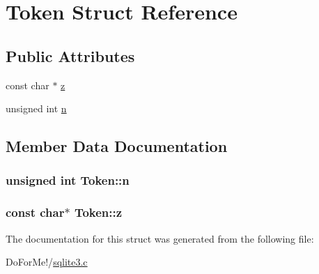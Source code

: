 \hypertarget{struct_token}{\section{Token Struct Reference}
\label{struct_token}
}
\subsection*{Public Attributes}
\begin{DoxyCompactItemize}
\item 
const char $\ast$ \hyperlink{struct_token_a57b502141e3018e4a02773424acb4ffd}{z}
\item 
unsigned int \hyperlink{struct_token_ad8442439e00ab9713a9b91a53e44c2aa}{n}
\end{DoxyCompactItemize}


\subsection{Member Data Documentation}
\hypertarget{struct_token_ad8442439e00ab9713a9b91a53e44c2aa}{
\subsubsection[{n}]{\setlength{\rightskip}{0pt plus 5cm}unsigned int Token\-::n}}\label{struct_token_ad8442439e00ab9713a9b91a53e44c2aa}
\hypertarget{struct_token_a57b502141e3018e4a02773424acb4ffd}{
\subsubsection[{z}]{\setlength{\rightskip}{0pt plus 5cm}const char$\ast$ Token\-::z}}\label{struct_token_a57b502141e3018e4a02773424acb4ffd}


The documentation for this struct was generated from the following file\-:\begin{DoxyCompactItemize}
\item 
Do\-For\-Me!/\hyperlink{sqlite3_8c}{sqlite3.\-c}\end{DoxyCompactItemize}
